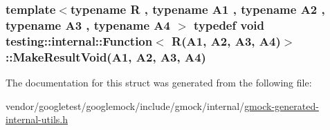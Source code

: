\subsubsection[{\texorpdfstring{Make\+Result\+Void}{MakeResultVoid}}]{\setlength{\rightskip}{0pt plus 5cm}template$<$typename R , typename A1 , typename A2 , typename A3 , typename A4 $>$ typedef void {\bf testing\+::internal\+::\+Function}$<$ R(A1, A2, A3, A4)$>$\+::Make\+Result\+Void(A1, A2, A3, A4)}\hypertarget{structtesting_1_1internal_1_1Function_3_01R_07A1_00_01A2_00_01A3_00_01A4_08_4_af7462da27e87a9d580e7f9748ebc5754}{}\label{structtesting_1_1internal_1_1Function_3_01R_07A1_00_01A2_00_01A3_00_01A4_08_4_af7462da27e87a9d580e7f9748ebc5754}


The documentation for this struct was generated from the following file\+:\begin{DoxyCompactItemize}
\item 
vendor/googletest/googlemock/include/gmock/internal/\hyperlink{gmock-generated-internal-utils_8h}{gmock-\/generated-\/internal-\/utils.\+h}\end{DoxyCompactItemize}
